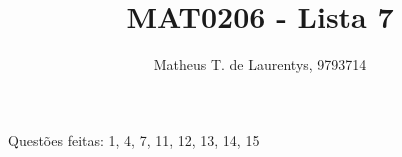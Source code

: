 \documentclass[15pt]{article}
\title{\vspace{-4.0cm}MAT0206 - Lista 7}
\author{Matheus T. de Laurentys, 9793714}
\begin{document}
	\maketitle
	
	Questões feitas: 1, 4, 7, 11, 12, 13, 14, 15
	
	
	
	
	
	
	
	
	
	
	
	
	
	
	
	
	
	
	
\end{document}
